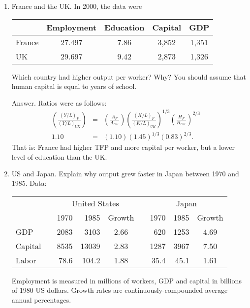 \documentclass[letterpaper,12pt]{article}
\begin{document}
\begin{enumerate}
\item France and the UK.  In 2000, the data were
%
\begin{center}
\begin{tabular}{lcccc}
\toprule 
                &   Employment   & Education & Capital  & GDP \\%
\midrule 
France  &  27.497 &  7.86 &  3,852 &  1,351 \\
UK      &  29.697 &  9.42 &  2,873 &  1,326 \\
\bottomrule 
\end{tabular}
\end{center}
%
Which country had higher output per worker?  Why?
You should assume that human capital is equal to years of school.

Answer.  Ratios were as follows:
\begin{eqnarray*}
    \left( \frac{(Y/L)_{F}}{(Y/L)_{UK}} \right) &=& \left( \frac{A_{F}}{A_{UK}} \right)
                        \left( \frac{(K/L)_{F}}{(K/L)_{UK}} \right)^{1/3}
                        \left( \frac{H_{F}}{H_{UK}} \right)^{2/3}  \\
            1.10              &=&   (1.10) (1.45)^{1/3} (0.83)^{2/3}  . \phantom{\sum^\infty}
\end{eqnarray*}
That is:  France had higher TFP and more capital per worker,
but a lower level of education than the UK.


\item US and Japan.
Explain why output grew faster in Japan between 1970 and 1985.
Data:
%
\begin{center}
\begin{tabular}{lcrrccrrc}
\toprule 
&&  \multicolumn{3}{c}{United States} && \multicolumn{3}{c}{Japan}        \\
                        \cline{3-5}  \cline{7-9}
&&              1970  & 1985 & Growth && 1970 & 1985 & Growth \\
\midrule 
GDP && 2083 &  3103  &  2.66    &  &   620  & 1253  &  4.69   \\
Capital      && 8535 & 13039  &  2.83    &  &  1287  & 3967  &  7.50   \\
Labor  && 78.6 & 104.2  &  1.88    &  &  35.4  & 45.1  &  1.61   \\
\bottomrule 
\end{tabular}
\end{center}
%
Employment is measured in millions of workers,
GDP and capital in
billions of 1980 US dollars.
Growth rates are continuously-compounded average annual percentages.


\end{enumerate}
\end{document}
